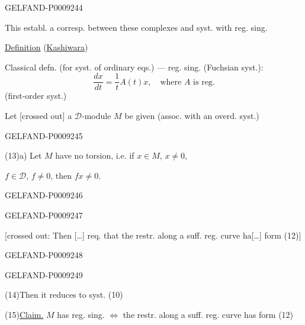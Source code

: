 \begin{GelfandAdjacentEvidence}{GELFAND-P000924}{4}


This establ. a corresp. between these complexes and syst. with reg. sing.

\underline{Definition} (\underline{Kashiwara}) 

Classical defn. (for syst. of ordinary eqs.) --- reg. sing. (Fuchsian syst.):
\begin{equation*}
 \frac{dx}{dt}=\frac1t A(t)x,\quad\text{where }A\text{ is reg}.
 \tag{12}
\end{equation*}
(first-order syst.)

Let [crossed out] a $\mathcal D$-module $M$ be given (assoc. with an overd. syst.)
\end{GelfandAdjacentEvidence}
\begin{GelfandAdjacentEvidence}{GELFAND-P000924}{5}


(13)\quad a) Let $M$ have no torsion, i.e. if $x\in M$, $x\ne0$,

$f\in\mathcal D$, $f\ne0$, then $fx\ne0$.
\end{GelfandAdjacentEvidence}
\begin{GelfandAdjacentEvidence}{GELFAND-P000924}{6}

\end{GelfandAdjacentEvidence}
\begin{GelfandAdjacentEvidence}{GELFAND-P000924}{7}


[crossed out: Then […] req. that the restr. along a suff. reg. curve ha[…] form (12)]
\end{GelfandAdjacentEvidence}
\begin{GelfandAdjacentEvidence}{GELFAND-P000924}{8}

\end{GelfandAdjacentEvidence}
\begin{GelfandAdjacentEvidence}{GELFAND-P000924}{9}


(14)\quad Then it reduces to syst. (10)

(15)\quad \underline{Claim.} $M$ has reg. sing. $\Longleftrightarrow$ the restr. along a suff. reg. curve has form (12)
\end{GelfandAdjacentEvidence}
